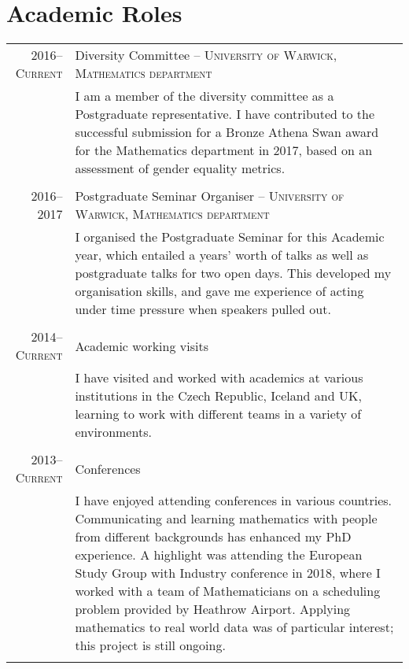 \documentclass[a4paper,10pt]{article}
\begin{document}
\section{Academic Roles}
\begin{tabular}{r|p{15cm}}
	\textsc{2016--Current}& Diversity Committee -- \textsc{University of Warwick, Mathematics department}\\&\footnotesize{I am a member of the diversity committee as a Postgraduate representative. I have contributed to the successful submission for a Bronze Athena Swan award for the Mathematics department in 2017, based on an assessment of gender equality metrics.}\\\multicolumn{2}{c}{} \\
	\textsc{2016--2017}& Postgraduate Seminar Organiser -- \textsc{University of Warwick, Mathematics department}\\&\footnotesize{I organised the Postgraduate Seminar for this Academic year, which entailed a years’ worth of talks as well as postgraduate talks for two open days. This developed my organisation skills, and gave me experience of acting under time pressure when speakers pulled out.}\\\multicolumn{2}{c}{} \\
	\textsc{2014--Current} & Academic working visits \\&\footnotesize{I have visited and worked with academics at various institutions in the Czech Republic, Iceland and UK, learning to work with different teams in a variety of environments.}\\\multicolumn{2}{c}{} \\
	\textsc{2013--Current} & Conferences \\&\footnotesize{I have enjoyed attending conferences in various countries. Communicating and learning mathematics with people from different backgrounds has enhanced my PhD experience. A highlight was attending the European Study Group with Industry conference in 2018, where I worked with a team of Mathematicians on a scheduling problem provided by Heathrow Airport. Applying mathematics to real world data was of particular interest; this project is still ongoing.}\\\multicolumn{2}{c}{} \\
\end{tabular}
\end{document}
